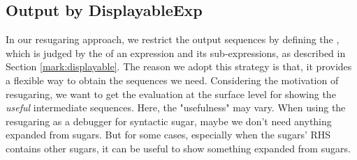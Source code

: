 \subsection{Output by DisplayableExp}
\label{mark:correctness}

In our resugaring approach, we restrict the output sequences by defining the , which is judged by the  of an expression and its sub-expressions, as described in Section \ref{mark:displayable}. The reason we adopt this strategy is that, it provides a flexible way to obtain the sequences we need. Considering the motivation of resugaring, we want to get the evaluation at the surface level for showing the \emph{useful} intermediate sequences. Here, the "usefulness" may vary. When using the resugaring as a debugger for syntactic sugar, maybe we don't need anything expanded from sugars. But for some cases, especially when the sugars' RHS contains other sugars, it can be useful to show something expanded from sugars.

